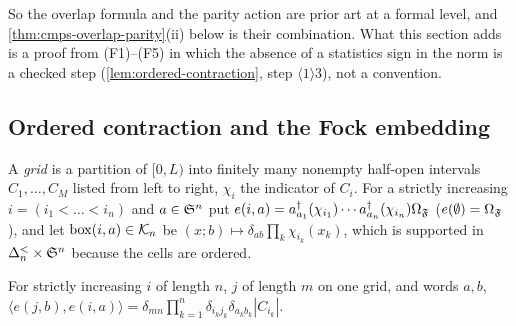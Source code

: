 So the overlap formula and the parity action are prior art at a formal level, and
\cref{thm:cmps-overlap-parity}(ii) below is their combination. What this section adds is a
proof from (F1)--(F5) in which the absence of a statistics sign in the norm is a checked step
(\cref{lem:ordered-contraction}, step $\langle1\rangle3$), not a convention.

\subsection{Ordered contraction and the Fock embedding}

A \emph{grid} is a partition of $[0,L)$ into finitely many nonempty half-open intervals
$C_1,\dots,C_M$ listed from left to right, $\chi_i$ the indicator of $C_i$. For a strictly
increasing $i=(i_1<\dots<i_n)$ and $a\in\mathfrak S^n$ put
$e(i,a)=a^\dagger_{a_1}(\chi_{i_1})\cdots a^\dagger_{a_n}(\chi_{i_n})\Omega_{\mathfrak F}$ ($e(\emptyset)=\Omega_{\mathfrak F}$),
and let $\mathrm{box}(i,a)\in\mathcal K_{n}$ be $(x;b)\mapsto\delta_{ab}\prod_k\chi_{i_k}(x_k)$, which is
supported in $\Delta^{<}_{n}\times\mathfrak S^n$ because the cells are ordered.

\begin{lemma}
\label{lem:ordered-contraction}
For strictly increasing $i$ of length $n$, $j$ of length $m$ on one grid, and words $a,b$,
$\langle e(j,b),e(i,a)\rangle=\delta_{mn}\prod_{k=1}^{n}\delta_{i_kj_k}\delta_{a_kb_k}|C_{i_k}|$.
\end{lemma}

